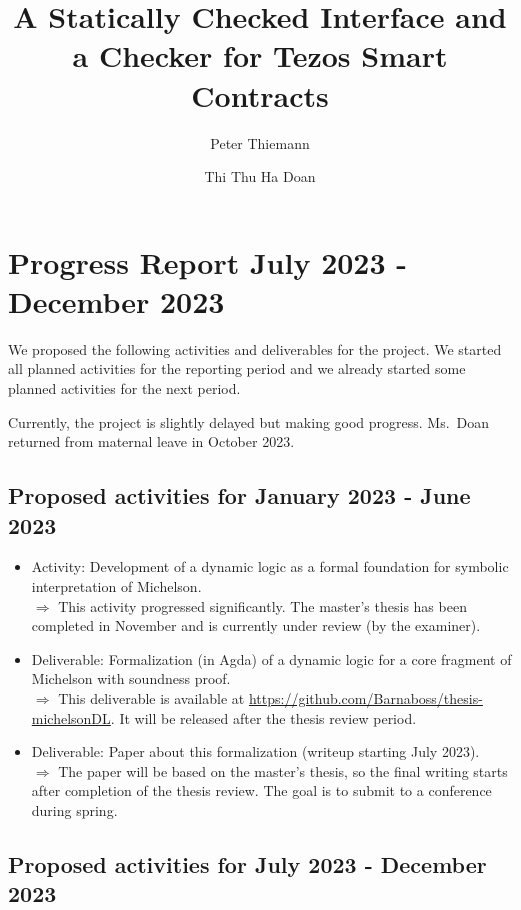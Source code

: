 \documentclass[a4paper,11pt]{article}
\title{A Statically Checked Interface and a Checker for Tezos Smart Contracts}
\author{Peter Thiemann}
\author{Thi Thu Ha Doan}
\affil{University of Freiburg, Germany}
\begin{document}
\maketitle{}

\section{Progress Report July 2023 - December 2023}
\label{sec:executive-summary}

We proposed the following activities and deliverables for the
project. We started all planned activities for the reporting period
and we already started some planned activities for the next period.

Currently, the project is slightly delayed but making good progress. Ms.\ Doan
returned from  maternal leave in October 2023.

\subsection{Proposed activities for January 2023 - June 2023}

\begin{itemize}
\item Activity: Development of a dynamic logic as a formal foundation for symbolic interpretation of Michelson. \\
  $\Rightarrow$ This activity progressed significantly.  The master's
  thesis has been completed in November and is currently under review (by the examiner).
\item Deliverable: Formalization (in Agda) of a dynamic logic for a core fragment of Michelson with soundness proof. \\
  $\Rightarrow$ This deliverable is available  at
  \url{https://github.com/Barnaboss/thesis-michelsonDL}. It will be
  released after the thesis review period.
\item Deliverable: Paper about this formalization (writeup starting
  July 2023). \\
  $\Rightarrow$ The paper will be based on the master's thesis, so the final writing
  starts after completion of the thesis review. The goal is to submit to a
  conference during spring.
\end{itemize}

\subsection{Proposed activities for July 2023 - December 2023}
\label{sec:july-2023-december}
\end{document}
